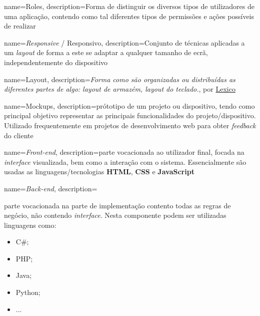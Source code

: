 




{
    name=Roles,
    description={Forma de distinguir os diversos tipos de utilizadores de uma aplicação, contendo como tal diferentes tipos de permissões e ações possíveis de realizar}
}

{
    name=\textit{Responsive} / Responsivo,
    description={Conjunto de técnicas aplicadas a um \textit{layout} de forma a este se adaptar a qualquer tamanho de ecrã, independentemente do dispositivo}
}

{
    name=Layout,
	description={\textit{Forma como são organizadas ou distribuídas as diferentes partes de algo: layout de armazém, layout do teclado.}, por \href{https://www.lexico.pt/layout/}{Lexico}}
}

{
    name=Mockups,
	description={prótotipo de um projeto ou dispositivo, tendo como principal objetivo representar as principais funcionalidades do projeto/dispositivo. Utilizado frequentemente em projetos de desenvolvimento web para obter \textit{feedback} do cliente}
}

{
    name=\textit{Front-end},
	description={parte vocacionada ao utilizador final, focada na \textit{interface} visualizada, bem como a interação com o sistema. Essencialmente são usadas as linguagens/tecnologias \textbf{HTML}, \textbf{CSS} e \textbf{JavaScript}}
}

{
    name=\textit{Back-end},
	description={parte vocacionada na parte de implementação contento todas as regras de negócio, não contendo \textit{interface}. Nesta componente podem ser utilizadas linguagens como:
	\begin{itemize}
		\item C\#;
		\item PHP;
		\item Java;
		\item Python;
		\item ...
	\end{itemize}}
}

